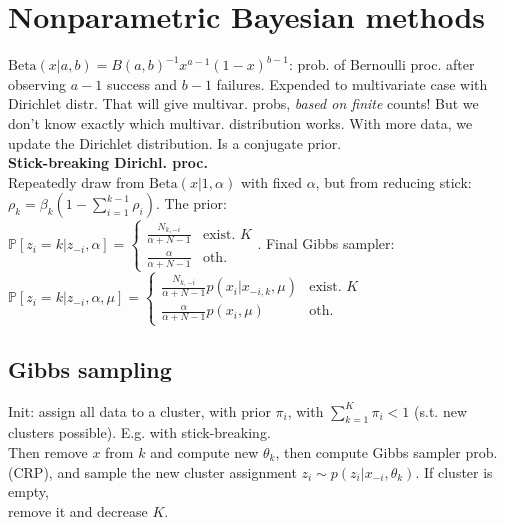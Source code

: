 \section*{Nonparametric Bayesian methods}
$\text{Beta}(x|a,b)=B(a,b)^{-1} x^{a-1}(1-x)^{b-1}$: prob. of Bernoulli proc. after observing $a-1$ success and $b-1$ failures. Expended to multivariate case with Dirichlet distr. That will give multivar. probs, \textit{based on finite} counts! But we don't know exactly which multivar. distribution works. With more data, we update the Dirichlet distribution. Is a conjugate prior.\\
\textbf{Stick-breaking Dirichl. proc.} \\ Repeatedly draw from $\text{Beta}(x|1,\alpha)$ with fixed $\alpha$, but from reducing stick: $\rho_k=\beta_k(1-\sum_{i=1}^{k-1}\rho_i)$. The prior:\\
$\mathbb{P}[z_i=k|z_{-i},\alpha]=\begin{cases}\frac{N_{k,-i}}{\alpha+N-1} & \text{exist. }K \\ \frac{\alpha}{\alpha+N-1} & \text{oth.}\end{cases}$. Final Gibbs sampler:\\
$\mathbb{P}[z_i=k|z_{-i},\alpha,\mu]=\begin{cases}\frac{N_{k,-i}}{\alpha+N-1}p(x_i|x_{-i,k},\mu) & \text{exist. }K \\ \frac{\alpha}{\alpha+N-1}p(x_i,\mu) & \text{oth.}\end{cases}$

\subsection*{Gibbs sampling}
Init: assign all data to a cluster, with prior $\pi_i$, with $\sum_{k=1}^K\pi_i<1$ (s.t. new clusters possible). E.g. with stick-breaking. \\
Then remove $x$ from $k$ and compute new $\theta_k$, then compute Gibbs sampler prob. (CRP), and sample the new cluster assignment $z_i\sim p(z_i|x_{-i},\theta_k)$. If cluster is empty, \\
remove it and decrease $K$.